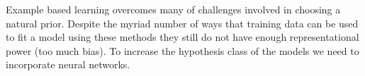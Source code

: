 Example based learning overcomes many of challenges involved in choosing a natural prior. 
%
Despite the myriad number of ways that training data can be used to fit a model using these methods they still do not have enough representational power (too much bias). 
%
To increase the hypothesis class of the models we need to incorporate neural networks.